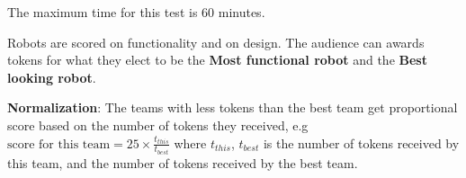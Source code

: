 The maximum time for this test is 60 minutes.

Robots are scored on functionality and on design.
The audience can awards tokens for what they elect to be the \textbf{Most functional robot} and the \textbf{Best looking robot}.

\begin{scorelist}



\end{scorelist}

\textbf{Normalization}: The teams with less tokens than the best team get proportional score based
on the number of tokens they received, e.g 
$\text{score for this team} = 25 \times \frac{t_{this}}{t_{best}}$
where $t_{this}$, $t_{best}$ is the number of tokens received by this team, and the number of tokens received by the best team.


